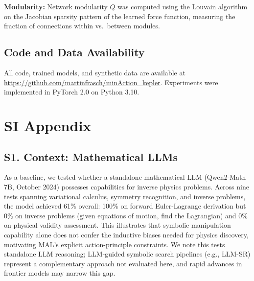 \documentclass[9pt,twocolumn,twoside]{pnas-new}
\begin{document}
\textbf{Modularity:} Network modularity $Q$ was computed using the Louvain algorithm \cite{Blondel2008} on the Jacobian sparsity pattern of the learned force function, measuring the fraction of connections within vs.\ between modules.

\subsection*{Code and Data Availability}
All code, trained models, and synthetic data are available at \url{https://github.com/martinfrasch/minAction_kepler}. Experiments were implemented in PyTorch 2.0 on Python 3.10.


\showmatmethods{}


\showacknow{}

\section*{SI Appendix}

\subsection*{S1. Context: Mathematical LLMs}
As a baseline, we tested whether a standalone mathematical LLM (Qwen2-Math 7B, October 2024) possesses capabilities for inverse physics problems. Across nine tests spanning variational calculus, symmetry recognition, and inverse problems, the model achieved 61\% overall: 100\% on forward Euler-Lagrange derivation but 0\% on inverse problems (given equations of motion, find the Lagrangian) and 0\% on physical validity assessment. This illustrates that symbolic manipulation capability alone does not confer the inductive biases needed for physics discovery, motivating MAL's explicit action-principle constraints. We note this tests standalone LLM reasoning; LLM-guided symbolic search pipelines (e.g., LLM-SR) represent a complementary approach not evaluated here, and rapid advances in frontier models may narrow this gap.
\end{document}

